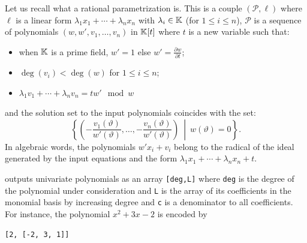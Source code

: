 \documentclass[a4paper,english,11pt]{scrartcl}
\theoremstyle{definition}
\theoremstyle{remark}
\newcommand{\st}{\ \middle|\ }
\def\leq{\leqslant}
\begin{document}
Let us recall what a rational parametrization is.
This is a couple $(\mathscr{P}, \ell)$ where $\ell$ is a linear form $\lambda_1
x_1 + \cdots + \lambda_n x_n$ with $\lambda_i\in \mathbb{K}$ (for $1\leq i \leq n$),
$\mathscr{P}$ is a sequence of polynomials $(w, w', v_1, \ldots, v_n)$ in
$\mathbb{K}[t]$ where $t$ is a new variable such that:
\begin{itemize}
\item when $\mathbb{K}$ is a prime field, $w'=1$ else $w' = \frac{\partial w}{\partial
    t}$;
\item $\deg(v_i) < \deg(w)$ for $1\leq i \leq n$;
\item $\lambda_1 v_1 +\cdots +\lambda_n v_n = tw' \mod w$
\end{itemize}
and the solution set to the input polynomials coincides with the set:
\[
\left \{\left (-\frac{v_1(\vartheta)}{w'(\vartheta)}, \ldots,
  -\frac{v_n(\vartheta)}{w'(\vartheta)}\right ) \st w(\vartheta) = 0
\right\}.
\]
In algebraic words, the polynomials \(w' x_i + v_i\) belong to the radical of the
ideal generated by the input equations and the form \(\lambda_1 x_1 + \cdots +
\lambda_n x_n + t\).

\msolve outputs univariate polynomials as an array \verb+[deg,L]+ where
\verb+deg+ is the degree of the polynomial under consideration and \verb+L+ is
the array of its coefficients in the monomial basis by increasing degree and
\verb+c+ is a denominator to all coefficients. For instance, the polynomial
\(x^2+3x-2\) is encoded by
\begin{verbatim}
[2, [-2, 3, 1]]
\end{verbatim}
\end{document}
